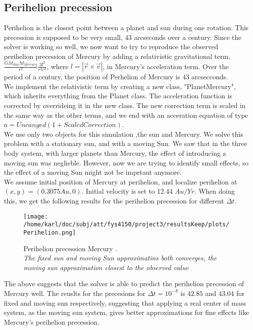 \documentclass{article}
\begin{document}
\subsection{Perihelion precession}
Perihelion is the closest point between a planet and sun during one rotation. This precession is supposed to be very small, 43 arcseconds over a century. Since the solver is working so well, we now want to try to reproduce the observed perihelion precession of Mercury by adding a relativistic gravitational term,$\frac{GM_{Sun} M_{Mercury}}{r^2} \frac{3l^2}{r^2c^2}$, where $l = |\vec{r} \times \vec{v}|$, in Mercury's acceleration term. Over the period of a century, the position of Perhelion of Mercury is 43 arcsecconds. \\

We implement the relativistic term by creating a new class, "PlanetMercury", which inherits everything from the Planet class. The acceleration function is corrected by overrideing it in the new class. The new correction term is scaled in the same way as the other terms, and we  end with an acceration equation of type $a = Uncanged(1 + ScaledCorrection)$. \\

We use only two objects for this simulation ,the sun and Mercury. We solve this problem with a stationary sun, and with a moving Sun. We saw that in the three body system, with larger planets than Mercury, the effect of introducing a moving sun was neglieble. However, now we are trying to identify small effects, so the effect of a moving Sun might not be imprtant anymore. \\

We assume initial position of Mercury at perihelion, and localize perihelion at $(x,y) = (0.3075 Au, 0)$. Initial velocity is set to 12.44 $Au/Yr$. When doing this, we get the following results for the perihelion precession for different $\Delta t$.\\

\begin{figure}[H]
	\centering
	\texttt{[image: /home/karl/doc/subj/att/fys4150/project3/resultsKeep/plots/Perihelion.png]}
	\caption{Perihelion precession Mercury . \\ \textit{The fixed sun and moving Sun approximatins both converges, the moving sun approximation closest to the observed value}}
	\label{1}
\end{figure}

The above suggests that the solver is able to predict the perihelion precession of Mercury well. The reuslts for the precesions for $\Delta t = 10^{-8}$ is $42.85$ and $43.04$ for fixed and moving sun respectively, suggesting that applying a real center of mass system, as the moving sun system, gives better approximations for fine effects like Mercury's perihelion precession.
\end{document}
